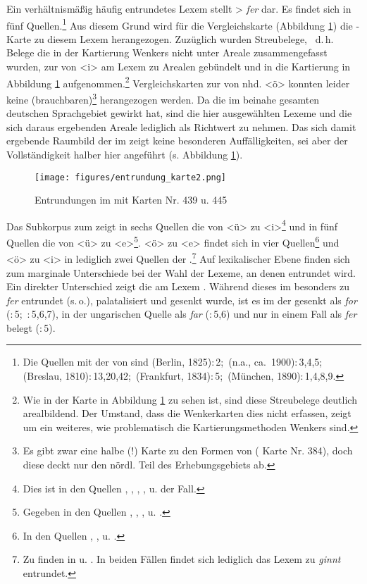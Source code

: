 Ein verhältnismäßig häufig entrundetes Lexem stellt  > \textit{fer} dar. Es findet sich in fünf Quellen.\footnote{Die Quellen mit der  von  sind   (Berlin, 1825):\,2;\,  (n.a., ca.\, 1900):\,3,4,5;\,  (Breslau, 1810):\,13,20,42;\,  (Frankfurt, 1834):\,5;\,  (München, 1890):\,1,4,8,9.} Aus diesem Grund wird für die Vergleichskarte (Abbildung \ref{karteentrundung}) die -Karte zu diesem Lexem herangezogen. Zuzüglich wurden Streubelege, \,%
d.\,h. Belege die in der Kartierung Wenkers nicht unter Areale zusammengefasst wurden, zur  von <i> am Lexem  zu Arealen gebündelt und in die Kartierung in Abbildung \ref{karteentrundung} aufgenommen.\footnote{Wie in der Karte in Abbildung \ref{karteentrundung} zu sehen ist, sind diese Streubelege deutlich arealbildend. Der Umstand, dass die Wenkerkarten dies nicht erfassen, zeigt um ein weiteres, wie problematisch die Kartierungsmethoden Wenkers sind.} Vergleichskarten zur  von nhd. <ö> konnten leider keine (brauchbaren)\footnote{Es gibt zwar eine halbe (!) Karte zu den Formen von  ( Karte Nr. 384), doch diese deckt nur den nördl. Teil des Erhebungsgebiets ab.} herangezogen werden. Da die  im beinahe gesamten deutschen Sprachgebiet gewirkt hat, sind die hier ausgewählten Lexeme und die sich daraus ergebenden Areale lediglich als Richtwert zu nehmen. Das sich damit ergebende Raumbild der  im  zeigt keine besonderen Auffälligkeiten, sei aber der Vollständigkeit halber hier angeführt (s. Abbildung \ref{karteentrundung}).


 \begin{figure}
 \texttt{[image: figures/entrundung\_karte2.png]}
		\caption{\label{karteentrundung} Entrundungen im  mit  Karten Nr. 439 u. 445}
		\end{figure}

 
Das Subkorpus zum  zeigt in sechs Quellen die  von <ü> zu <i>\footnote{Dies ist in den Quellen , , , ,  u.  der Fall.} und in fünf Quellen die von <ü> zu <e>\footnote{Gegeben in den Quellen , , ,  u. .}. <ö> zu <e> findet sich in vier Quellen\footnote{In den Quellen , ,  u. .} und <ö> zu <i> in lediglich zwei Quellen der .\footnote{Zu finden in  u. . In beiden Fällen findet sich lediglich das Lexem  zu \textit{ginnt} entrundet.} Auf lexikalischer Ebene finden sich zum  marginale Unterschiede bei der Wahl der Lexeme, an denen entrundet wird. Ein direkter Unterschied zeigt die  am Lexem . Während dieses im  besonders zu \textit{fer} entrundet (s.\,o.), palatalisiert und gesenkt wurde, ist es im  der  gesenkt als \textit{for} (:\,5;\, :\,5,6,7), in der ungarischen Quelle  als \textit{far} (:\,5,6) und nur in einem Fall als \textit{fer} belegt (:\,5).

